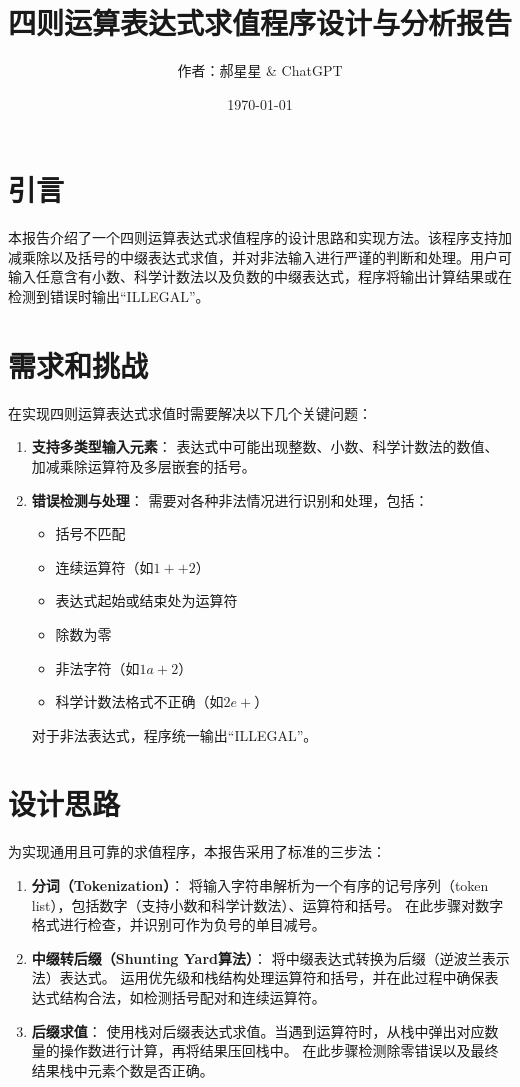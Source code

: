\documentclass[UTF8]{ctexart}
\title{四则运算表达式求值程序设计与分析报告}
\author{作者：郝星星 \& ChatGPT}
\date{\today}
\begin{document}
\maketitle

\section{引言}
本报告介绍了一个四则运算表达式求值程序的设计思路和实现方法。该程序支持加减乘除以及括号的中缀表达式求值，并对非法输入进行严谨的判断和处理。用户可输入任意含有小数、科学计数法以及负数的中缀表达式，程序将输出计算结果或在检测到错误时输出“ILLEGAL”。

\section{需求和挑战}
在实现四则运算表达式求值时需要解决以下几个关键问题：
\begin{enumerate}
    \item \textbf{支持多类型输入元素}：  
    表达式中可能出现整数、小数、科学计数法的数值、加减乘除运算符及多层嵌套的括号。
    \item \textbf{错误检测与处理}：  
    需要对各种非法情况进行识别和处理，包括：
    \begin{itemize}
        \item 括号不匹配
        \item 连续运算符（如$1++2$）
        \item 表达式起始或结束处为运算符
        \item 除数为零
        \item 非法字符（如$1a+2$）
        \item 科学计数法格式不正确（如$2e+$）
    \end{itemize}
    对于非法表达式，程序统一输出“ILLEGAL”。
\end{enumerate}

\section{设计思路}
为实现通用且可靠的求值程序，本报告采用了标准的三步法：
\begin{enumerate}
    \item \textbf{分词（Tokenization）}：  
    将输入字符串解析为一个有序的记号序列（token list），包括数字（支持小数和科学计数法）、运算符和括号。  
    在此步骤对数字格式进行检查，并识别可作为负号的单目减号。

    \item \textbf{中缀转后缀（Shunting Yard算法）}：  
    将中缀表达式转换为后缀（逆波兰表示法）表达式。  
    运用优先级和栈结构处理运算符和括号，并在此过程中确保表达式结构合法，如检测括号配对和连续运算符。

    \item \textbf{后缀求值}：  
    使用栈对后缀表达式求值。当遇到运算符时，从栈中弹出对应数量的操作数进行计算，再将结果压回栈中。  
    在此步骤检测除零错误以及最终结果栈中元素个数是否正确。
\end{enumerate}
\end{document}
